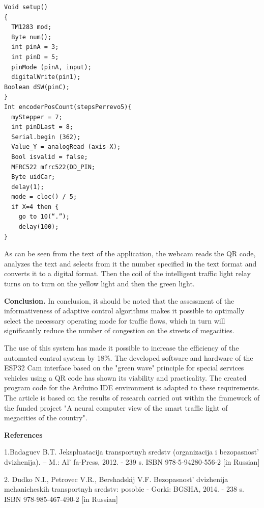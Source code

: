 \begin{verbatim}
Void setup()
{
  TM1283 mod;
  Byte num();
  int pinA = 3;
  int pinD = 5;
  pinMode (pinA, input);
  digitalWrite(pin1);
Boolean dSW(pinC);
}
Int encoderPosCount(stepsPerrevo5){
  myStepper = 7;
  int pinDLast = 8;
  Serial.begin (362);
  Value_Y = analogRead (axis-X);
  Bool isvalid = false;
  MFRC522 mfrc522(DD_PIN;
  Byte uidCar;
  delay(1);
  mode = cloc() / 5;
  if X=4 then {
    go to 10(“.”);
    delay(100);
}
\end{verbatim}

\begin{multicols}{2}
As can be seen from the text of the application, the webcam reads the QR
code, analyzes the text and selects from it the number specified in the
text format and converts it to a digital format. Then the coil of the
intelligent traffic light relay turns on to turn on the yellow light and
then the green light.

{\bfseries Conclusion.} In conclusion, it should be noted that the
assessment of the informativeness of adaptive control algorithms makes
it possible to optimally select the necessary operating mode for traffic
flows, which in turn will significantly reduce the number of congestion
on the streets of megacities.

The use of this system has made it possible to increase the efficiency
of the automated control system by 18\%. The developed software and
hardware of the ESP32 Cam interface based on the "green wave" principle
for special services vehicles using a QR code has shown its viability
and practicality. The created program code for the Arduino IDE
environment is adapted to these requirements. The article is based on
the results of research carried out within the framework of the funded
project "A neural computer view of the smart traffic light of megacities
of the country".
\end{multicols}

\begin{center}
{\bfseries References}
\end{center}

1.Badaguev B.T. Jekspluatacija transportnyh sredstv (organizacija i
bezopasnost'{} dvizhenija). -- M.:
Al' fa-Press, 2012. - 239 s. ISBN 978-5-94280-556-2 {[}in
Russian{]}

2. Dudko N.I., Petrovec V.R., Bershadskij V.F.
Bezopasnost'{} dvizhenija mehanicheskih transportnyh
sredstv: posobie - Gorki: BGSHA, 2014. - 238 s. ISBN 978-985-467-490-2
{[}in Russian{]}

